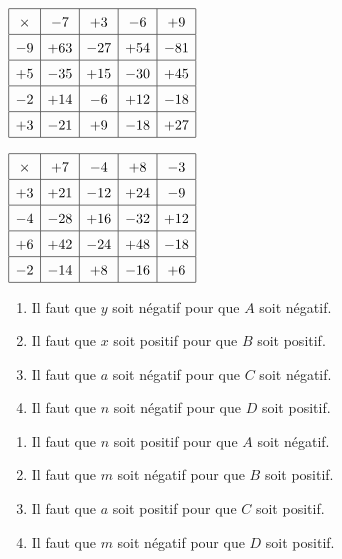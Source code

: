 \clearpage

\begin{Correction}
\begin{EXO}{}{}

 $\def\arraystretch{1.5}\begin{array}{|c|c|c|c|c|}
    \hline
    \times & -7 & +3 & -6 & +9 \\
    \hline
    -9 & +63 & -27 & +54 & -81 \\
    \hline
    +5 & -35 & +15 & -30 & +45 \\
    \hline
    -2 & +14 & -6 & +12 & -18 \\
    \hline
    +3 & -21 & +9 & -18 & +27 \\
    \hline
    \end{array}$
\end{EXO}

\begin{EXO}{}{}

 $\def\arraystretch{1.5}\begin{array}{|c|c|c|c|c|}
    \hline
    \times & +7 & -4 & +8 & -3 \\
    \hline
    +3 & +21 & -12 & +24 & -9 \\
    \hline
    -4 & -28 & +16 & -32 & +12 \\
    \hline
    +6 & +42 & -24 & +48 & -18 \\
    \hline
    -2 & -14 & +8 & -16 & +6 \\
    \hline
    \end{array}$
\end{EXO}

\begin{EXO}{}{}

\begin{enumerate}[itemsep=1em]
	\item Il faut que $ y $ soit négatif pour que $A$ soit négatif.
	\item Il faut que $ x $ soit positif pour que $B$ soit positif.
	\item Il faut que $ a $ soit négatif pour que $C$ soit négatif.
	\item Il faut que $ n $ soit négatif pour que $D$ soit positif.
\end{enumerate}
\end{EXO}

\begin{EXO}{}{}

\begin{enumerate}[itemsep=1em]
	\item Il faut que $ n $ soit positif pour que $A$ soit négatif.
	\item Il faut que $ m $ soit négatif pour que $B$ soit positif.
	\item Il faut que $ a $ soit positif pour que $C$ soit positif.
	\item Il faut que $ m $ soit négatif pour que $D$ soit positif.
\end{enumerate}
\end{EXO}


\end{Correction}
